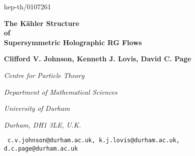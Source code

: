 \documentclass[a4paper,12pt]{article}
\begin{document}
  
  
\bigskip  
\hskip 4.7in\vbox{\baselineskip12pt  
\hbox{hep-th/0107261}}  
  
\bigskip  
\bigskip  
\bigskip  
\bigskip  
\bigskip  
\bigskip 
  
\begin{center}
{\Large \bf The K\"ahler Structure}\\
\bigskip
{\Large \bf of} \\
\bigskip
{\Large \bf Supersymmetric Holographic RG Flows}
  \end{center}
\bigskip  
\bigskip  
\bigskip  
\bigskip 
  
\centerline{\bf Clifford V. Johnson, Kenneth J.
  Lovis, David C. Page}
  
  
\bigskip  
\bigskip  
\bigskip  
  

\centerline{\it Centre  
for Particle Theory}
  \centerline{\it Department of Mathematical Sciences}  
\centerline{\it University of  
Durham}
\centerline{\it Durham, DH1 3LE, U.K.}  

\centerline{\myHighlight{$\phantom{and}$}\coordHE{}}  

\bigskip  
 
  
\centerline{\small \tt  
  c.v.johnson@durham.ac.uk, k.j.lovis@durham.ac.uk, d.c.page@durham.ac.uk}  
  
\bigskip  
\bigskip  
\bigskip  

  
\begin{abstract}  
  \vskip 4pt We study the metrics on the families of moduli spaces
  arising from probing with a brane the ten and eleven dimensional
  supergravity solutions corresponding to renormalisation group flows
  of supersymmetric large \coordHE{} gauge theory.  In comparing the geometry
  to the physics of the dual gauge theory, it is important to identify
  appropriate coordinates, and starting with the case of \coordHE{} gauge
  theories flowing from \coordHE{} to \coordHE{} {\it via} a
  mass term, we demonstrate that the metric is K\"ahler, and solve for
  the K\"ahler potential everywhere along the flow. We show that the
  asymptotic form of the K\"ahler potential, and hence the peculiar
  conical form of the metric, follows from special properties of the
  gauge theory.  Furthermore, we find the analogous K\"ahler structure
  for the \coordHE{} preserving Coulomb branch flows, and for an
  \coordHE{} flow. In addition, we establish similar properties
  for two eleven dimensional flow geometries recently presented in the
  literature, one of which has a deformation of the conifold as its
  moduli space.  In all of these cases, we notice that the K\"ahler
  potential appears to satisfy a simple universal differential
  equation. We prove that this equation arises for all purely Coulomb
  branch flows dual to both ten and eleven dimensional geometries, and
  conjecture that the equation holds much more generally.
\end{abstract}  
\newpage  
\baselineskip=18pt  
\setcounter{footnote}{0}  
  
\end{document}
